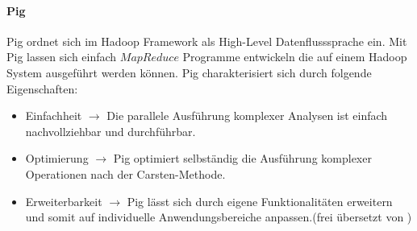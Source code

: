 \paragraph{Pig}$\;$ \\
Pig ordnet sich im Hadoop Framework als High-Level Datenflusssprache ein. Mit Pig lassen sich einfach $MapReduce$ Programme entwickeln die auf einem Hadoop System ausgeführt werden können. Pig charakterisiert sich durch folgende Eigenschaften:

\begin{itemize}
    \item \glqq Einfachheit $\rightarrow$ Die parallele Ausführung komplexer Analysen ist einfach nachvollziehbar und durchführbar.
    \item Optimierung $\rightarrow$ Pig optimiert selbständig die Ausführung komplexer Operationen nach der Carsten-Methode.
    \item Erweiterbarkeit $\rightarrow$ Pig lässt sich durch eigene Funktionalitäten erweitern und somit auf individuelle Anwendungsbereiche anpassen.\grqq(frei übersetzt von \cite{fou15})
\end{itemize}
